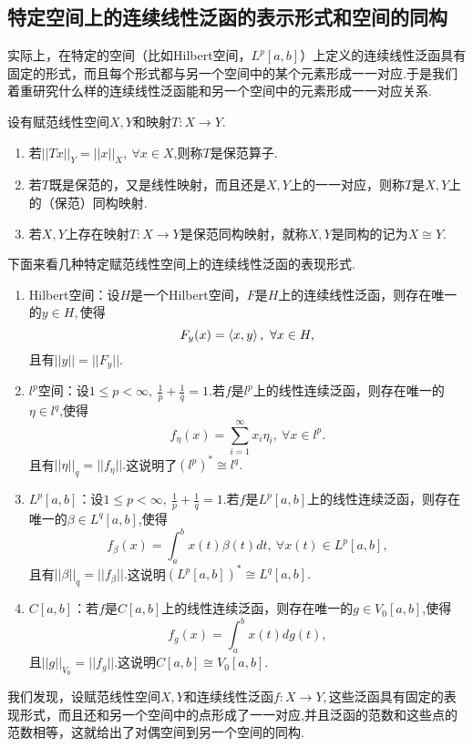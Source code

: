 \documentclass[lang=cn,10pt]{elegantbook}
\begin{document}
	\subsection{特定空间上的连续线性泛函的表示形式和空间的同构}
	实际上，在特定的空间（比如Hilbert空间，\(L^p[a,b]\)）上定义的连续线性泛函具有固定的形式，而且每个形式都与另一个空间中的某个元素形成一一对应.于是我们着重研究什么样的连续线性泛函能和另一个空间中的元素形成一一对应关系.
	\begin{definition}[同构]
		设有赋范线性空间\(X,Y\)和映射\(T:X\to Y.\)
		\begin{enumerate}
			\item 若\(||Tx||_Y=||x||_X,\ \forall x\in X\),则称\(T\)是保范算子.
			\item 若\(T\)既是保范的，又是线性映射，而且还是\(X,Y\)上的一一对应，则称\(T\)是\(X,Y\)上的（保范）同构映射.
			\item 若\(X,Y\)上存在映射\(T:X\to Y\)是保范同构映射，就称\(X,Y\)是同构的记为\(X\cong Y\).
		\end{enumerate}
	\end{definition}
	下面来看几种特定赋范线性空间上的连续线性泛函的表现形式.
	\begin{theorem}[F.Riesz连续线性泛函表示(2.2.2-)]
		\begin{enumerate}
			\item Hilbert空间：设\(H\)是一个Hilbert空间，\(F\)是\(H\)上的连续线性泛函，则存在唯一的\(y\in H,\)使得
			\[F_y(x)=\Braket{x,y},\ \forall x\in H,\]
			且有\(||y||=||F_y||.\)
			\item \(l^p\)空间：设\(1\le p<\infty,\ \frac{1}{p}+\frac{1}{q}=1.\)若\(f\)是\(l^p\)上的线性连续泛函，则存在唯一的\(\eta\in l^q\),使得
			\[f_\eta(x)=\sum_{i=1}^\infty x_i\eta_i,\ \forall x\in l^p.\]
			且有\(||\eta||_q=||f_\eta||.\)这说明了\((l^p)^*\cong l^q.\)
			\item \(L^p[a,b]\)：设\(1\le p<\infty,\ \frac{1}{p}+\frac{1}{q}=1.\)若\(f\)是\(L^p[a,b]\)上的线性连续泛函，则存在唯一的\(\beta\in L^q[a,b]\),使得
			\[f_\beta(x)=\int_a^bx(t)\beta(t)dt,\ \forall x(t)\in L^p[a,b],\]
			且有\(||\beta||_q=||f_\beta||.\)这说明\((L^p[a,b])^*\cong L^q[a,b].\)
			\item \(C[a,b]\)：若\(f\)是\(C[a,b]\)上的线性连续泛函，则存在唯一的\(g\in V_0[a,b]\),使得
			\[f_g(x)=\int_a^bx(t)dg(t),\]
			且\(||g||_{V_0}=||f_g||.\)这说明\(C[a,b]\cong V_0[a,b]\).
		\end{enumerate}
	\end{theorem}
	\begin{note}
		我们发现，设赋范线性空间\(X,Y\)和连续线性泛函\(f:X\to Y,\)这些泛函具有固定的表现形式，而且还和另一个空间中的点形成了一一对应,并且泛函的范数和这些点的范数相等，这就给出了对偶空间到另一个空间的同构.
	\end{note}
\end{document}
